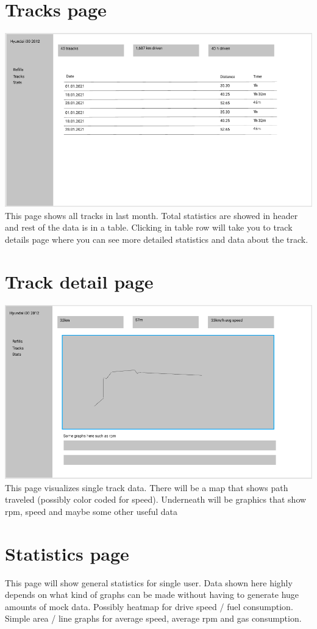 \section{Tracks page}\label{sec:tracks-page}
\includegraphics[width=\textwidth]{figures/tracks_page}
This page shows all tracks in last month.
Total statistics are showed in header and rest of the data is in a table.
Clicking in table row will take you to track details page where you can see more detailed statistics and data about the track.

\section{Track detail page}\label{sec:track-detail-page}
\includegraphics[width=\textwidth]{figures/track_detail_page}
This page visualizes single track data.
There will be a map that shows path traveled (possibly color coded for speed).
Underneath will be graphics that show rpm, speed and maybe some other useful data

\section{Statistics page}\label{sec:stats-page}
This page will show general statistics for single user.
Data shown here highly depends on what kind of graphs can be made without having to generate huge amounts of mock data.
Possibly heatmap for drive speed / fuel consumption.
Simple area / line graphs for average speed, average rpm and gas consumption.